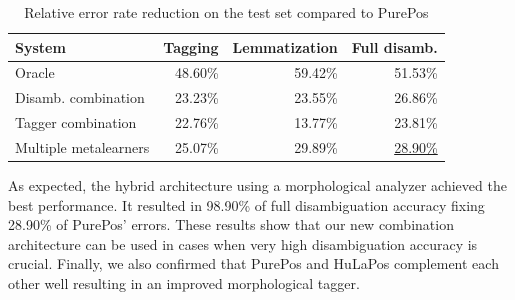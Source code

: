 \begin{table}[h]
\centering
\caption{Relative error rate reduction on the test set compared to PurePos}\label{tab:comb-eval}
\begin{tabular}{l r r r}
\hline
System & Tagging & Lemmatization & Full disamb. \\
\hline
Oracle & 48.60\% & 59.42\% & 51.53\% \\
Disamb. combination & 23.23\% & 23.55\% & 26.86\% \\
Tagger combination & 22.76\% & 13.77\% & 23.81\% \\
Multiple metalearners & 25.07\% & 29.89\% & \underline{28.90\%} \\
\hline
\end{tabular}
\end{table}

As expected, the hybrid architecture using a morphological analyzer achieved the best performance.
It resulted in 98.90\% of full disambiguation accuracy fixing 28.90\% of PurePos’ errors.
These results show that our new combination architecture can be used in cases when very high disambiguation accuracy is crucial.
Finally, we also confirmed that PurePos and HuLaPos complement each other well resulting in an improved morphological tagger. 



 

 

 

 
